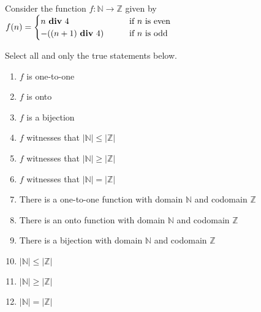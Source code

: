 
Consider the function $f: \mathbb{N} \to  \mathbb{Z}$ given by 
$f(n)  =  \begin{cases}
    n~\text{\bf div}~4  \qquad &\text{if $n$ is even} \\
    -( (n+1)~\text{\bf div}~4) \qquad &\text{if $n$ is odd}
\end{cases}$
    
Select all and only the true statements below.
    \begin{enumerate}
        \item $f$ is one-to-one
        \item $f$ is onto
        \item $f$ is a bijection
        \item $f$ witnesses that $|\mathbb{N}| \leq |\mathbb{Z}|$
        \item $f$ witnesses that $|\mathbb{N}| \geq |\mathbb{Z}|$
        \item $f$ witnesses that $|\mathbb{N}| = |\mathbb{Z}|$
        \item There is a one-to-one function
        with domain $\mathbb{N}$ and codomain
        $\mathbb{Z}$
        \item There is an  onto function
        with domain $\mathbb{N}$ and codomain
        $\mathbb{Z}$
        \item There is a bijection
        with domain $\mathbb{N}$ and codomain
        $\mathbb{Z}$
    
        \item $|\mathbb{N}| \leq |\mathbb{Z}|$
        \item $|\mathbb{N}| \geq |\mathbb{Z}|$
        \item $|\mathbb{N}| = |\mathbb{Z}|$
    \end{enumerate}